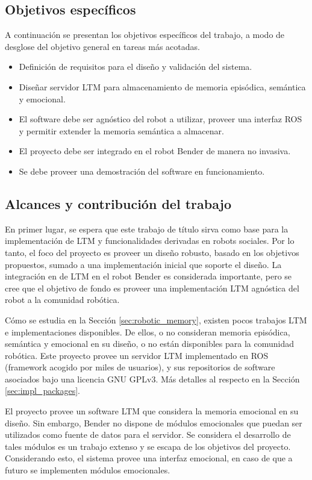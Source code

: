 \subsection{Objetivos específicos}

A continuación se presentan los objetivos específicos del trabajo, a modo de desglose del objetivo general en tareas más acotadas.
\begin{itemize}
	\item Definición de requisitos para el diseño y validación del sistema.
	\item Diseñar servidor LTM para almacenamiento de memoria episódica, semántica y emocional.
	\item El software debe ser agnóstico del robot a utilizar, proveer una interfaz ROS y permitir extender la memoria semántica a almacenar.
	\item El proyecto debe ser integrado en el robot Bender de manera no invasiva.
	\item Se debe proveer una demostración del software en funcionamiento.
\end{itemize}

\subsection{Alcances y contribución del trabajo}

En primer lugar, se espera que este trabajo de título sirva como base para la implementación de LTM y funcionalidades derivadas en robots sociales. Por lo tanto, el foco del proyecto es proveer un diseño robusto, basado en los objetivos propuestos, sumado a una implementación inicial que soporte el diseño. La integración en de LTM en el robot Bender es considerada importante, pero se cree que el objetivo de fondo es proveer una implementación LTM agnóstica del robot a la comunidad robótica.

Cómo se estudia en la Sección \ref{sec:robotic_memory}, existen pocos trabajos LTM e implementaciones disponibles. De ellos, o no consideran memoria episódica, semántica y emocional en su diseño, o no están disponibles para la comunidad robótica. Este proyecto provee un servidor LTM implementado en ROS (framework acogido por miles de usuarios\cite{ROS:2009}), y sus repositorios de software asociados bajo una licencia GNU GPLv3. Más detalles al respecto en la Sección \ref{sec:impl_packages}.

El proyecto provee un software LTM que considera la memoria emocional en su diseño. Sin embargo, Bender no dispone de módulos emocionales que puedan ser utilizados como fuente de datos para el servidor. Se considera el desarrollo de tales módulos es un trabajo extenso y se escapa de los objetivos del proyecto. Considerando esto, el sistema provee una interfaz emocional, en caso de que a futuro se implementen módulos emocionales.

